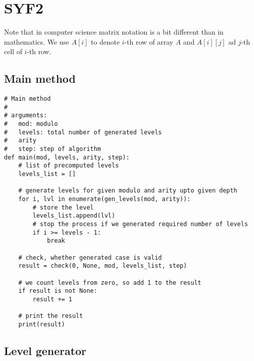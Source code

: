 \documentclass{article}
\begin{document}
\clearpage
\section{SYF2}

Note that in computer science matrix notation is a bit different than in mathematics.  We use $A[i]$ to denote $i$-th row of array $A$ and $A[i][j]$ ad $j$-th cell of $i$-th row.

\subsection{Main method}

\begin{verbatim}
# Main method
#
# arguments:
#   mod: modulo
#   levels: total number of generated levels
#   arity
#   step: step of algorithm
def main(mod, levels, arity, step):
    # list of precomputed levels
    levels_list = []

    # generate levels for given modulo and arity upto given depth
    for i, lvl in enumerate(gen_levels(mod, arity)):
        # store the level
        levels_list.append(lvl)
        # stop the process if we generated required number of levels
        if i >= levels - 1:
            break

    # check, whether generated case is valid
    result = check(0, None, mod, levels_list, step)

    # we count levels from zero, so add 1 to the result
    if result is not None:
        result += 1

    # print the result
    print(result)
\end{verbatim}

\subsection{Level generator}
\end{document}
